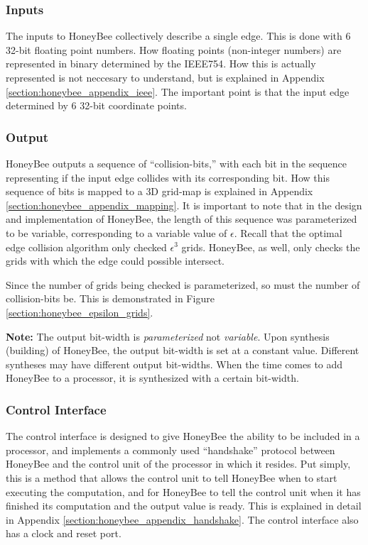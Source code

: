     \subsubsection{Inputs}
        The inputs to HoneyBee collectively describe a single edge. This is done with 6 32-bit floating point numbers. How floating points (non-integer numbers) are represented in binary determined by the \gls{IEEE754}. How this is actually represented is not neccesary to understand, but is explained in Appendix \ref{section:honeybee_appendix_ieee}. The important point is that the input edge determined by 6 32-bit coordinate points.

    \subsubsection{Output}
        HoneyBee outputs a sequence of ``collision-bits,'' with each bit in the sequence representing if the input edge collides with its corresponding bit. How this sequence of bits is mapped to a \gls{3D} grid-map is explained in Appendix \ref{section:honeybee_appendix_mapping}. It is important to note that in the design and implementation of HoneyBee, the length of this sequence was parameterized to be variable, corresponding to a variable value of $\epsilon$. Recall that the optimal edge collision algorithm only checked $\epsilon^3$ grids. HoneyBee, as well, only checks the grids with which the edge could possible intersect.

        Since the number of grids being checked is parameterized, so must the number of collision-bits be. This is demonstrated in Figure \ref{section:honeybee_epsilon_grids}.
        

        \textbf{Note:} The output \gls{bit-width} is \textit{parameterized} not \textit{variable}. Upon synthesis (building) of HoneyBee, the output \gls{bit-width} is set at a constant value. Different syntheses may have different output \glspl{bit-width}. When the time comes to add HoneyBee to a processor, it is synthesized with a certain \gls{bit-width}.

    \subsubsection{Control Interface}
        The control interface is designed to give HoneyBee the ability to be included in a processor, and implements a commonly used ``handshake'' protocol between HoneyBee and the control unit of the processor in which it resides. Put simply, this is a method that allows the control unit to tell HoneyBee when to start executing the computation, and for HoneyBee to tell the control unit when it has finished its computation and the output value is ready. This is explained in detail in Appendix \ref{section:honeybee_appendix_handshake}. The control interface also has a clock and reset port.


